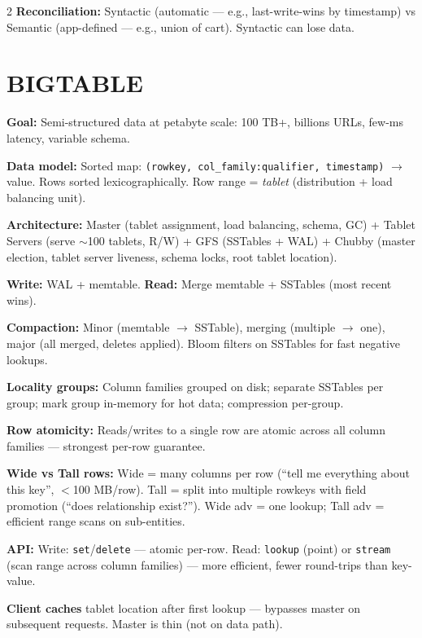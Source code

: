 \documentclass[9pt]{article}
\begin{document}
\begin{multicols*}{2}
\textbf{Reconciliation:} Syntactic (automatic — e.g., last-write-wins by timestamp) vs Semantic (app-defined — e.g., union of cart). Syntactic can lose data.

\section*{BIGTABLE}

\textbf{Goal:} Semi-structured data at petabyte scale: 100 TB+, billions URLs, few-ms latency, variable schema.

\textbf{Data model:} Sorted map: \texttt{(rowkey, col\_family:qualifier, timestamp)} $\to$ value. Rows sorted lexicographically. Row range = \emph{tablet} (distribution + load balancing unit).

\textbf{Architecture:} Master (tablet assignment, load balancing, schema, GC) + Tablet Servers (serve $\sim$100 tablets, R/W) + GFS (SSTables + WAL) + Chubby (master election, tablet server liveness, schema locks, root tablet location).

\textbf{Write:} WAL + memtable. \textbf{Read:} Merge memtable + SSTables (most recent wins).

\textbf{Compaction:} Minor (memtable $\to$ SSTable), merging (multiple $\to$ one), major (all merged, deletes applied). Bloom filters on SSTables for fast negative lookups.

\textbf{Locality groups:} Column families grouped on disk; separate SSTables per group; mark group in-memory for hot data; compression per-group.

\textbf{Row atomicity:} Reads/writes to a single row are atomic across all column families — strongest per-row guarantee.

\textbf{Wide vs Tall rows:} Wide = many columns per row (``tell me everything about this key'', $<$100 MB/row). Tall = split into multiple rowkeys with field promotion (``does relationship exist?''). Wide adv = one lookup; Tall adv = efficient range scans on sub-entities.

\textbf{API:} Write: \texttt{set}/\texttt{delete} — atomic per-row. Read: \texttt{lookup} (point) or \texttt{stream} (scan range across column families) — more efficient, fewer round-trips than key-value.

\textbf{Client caches} tablet location after first lookup — bypasses master on subsequent requests. Master is thin (not on data path).


\end{multicols*}
\end{document}
